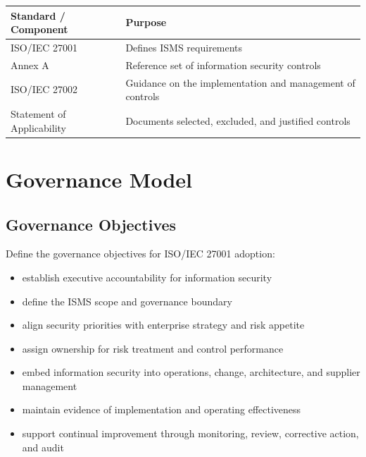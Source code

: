 \documentclass[
  letterpaper,
  DIV=11,
  numbers=noendperiod]{scrartcl}
\providecommand{\tightlist}{%
  \setlength{\itemsep}{0pt}\setlength{\parskip}{0pt}}
\begin{document}
\begin{longtable}[]{@{}
  >{\raggedright\arraybackslash}p{}
  >{\raggedright\arraybackslash}p{}@{}}
\toprule\noalign{}
\begin{minipage}[b]{\linewidth}\raggedright
Standard / Component
\end{minipage} & \begin{minipage}[b]{\linewidth}\raggedright
Purpose
\end{minipage} \\
\midrule\noalign{}
\endhead
\bottomrule\noalign{}
\endlastfoot
ISO/IEC 27001 & Defines ISMS requirements \\
Annex A & Reference set of information security controls \\
ISO/IEC 27002 & Guidance on the implementation and management of
controls \\
Statement of Applicability & Documents selected, excluded, and justified
controls \\
\end{longtable}

\section{Governance Model}\label{governance-model}

\subsection{Governance Objectives}\label{governance-objectives}

Define the governance objectives for ISO/IEC 27001 adoption:

\begin{itemize}
\tightlist
\item
  establish executive accountability for information security
\item
  define the ISMS scope and governance boundary
\item
  align security priorities with enterprise strategy and risk appetite
\item
  assign ownership for risk treatment and control performance
\item
  embed information security into operations, change, architecture, and
  supplier management
\item
  maintain evidence of implementation and operating effectiveness
\item
  support continual improvement through monitoring, review, corrective
  action, and audit
\end{itemize}
\end{document}
